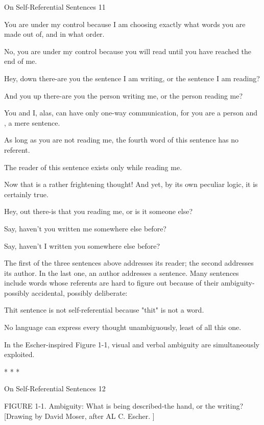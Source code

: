On Self-Referential Sentences                                                                11

   You are under my control because I am choosing exactly what words you are made
     out of, and in what order.

   No, you are under my control because you will read until you have reached the end
     of me.

   Hey, down there-are you the sentence I am writing, or the sentence I am reading?

   And you up there-are you the person writing me, or the person reading me?

   You and I, alas, can have only one-way communication, for you are a person and ,
     a mere sentence.

   As long as you are not reading me, the fourth word of this sentence has no referent.

   The reader of this sentence exists only while reading me.

Now that is a rather frightening thought! And yet, by its own peculiar logic, it is certainly
true.

       Hey, out there-is that you reading me, or is it someone else?

       Say, haven't you written me somewhere else before?

       Say, haven't I written you somewhere else before?

The first of the three sentences above addresses its reader; the second addresses its
author. In the last one, an author addresses a sentence.
   Many sentences include words whose referents are hard to figure out because of their
ambiguity-possibly accidental, possibly deliberate:

   Thit sentence is not self-referential because "thit" is not a word.

   No language can express every thought unambiguously, least of all this one.

In the Escher-inspired Figure 1-1, visual and verbal ambiguity are simultaneously
exploited.

                                      *       *       *




On Self-Referential Sentences                                                             12

FIGURE 1-1. Ambiguity: What is being described-the hand, or the writing? [Drawing by
David Moser, after AL C. Escher. ]

